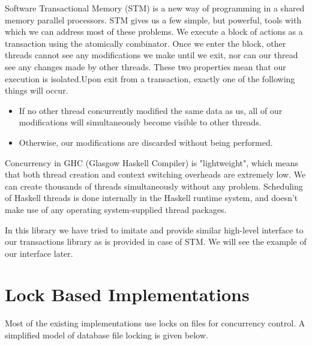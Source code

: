 \documentclass[11pt,a4paper]{article}
\begin{document}
Software Transactional Memory (STM) is a new way of programming in a shared memory parallel processors. STM gives us a few simple, but powerful, tools with which we can address most of these problems. We execute a block of actions as a transaction using the atomically combinator. Once we enter the block, other threads cannot see any modifications we make until we exit, nor can our thread see any changes made by other threads. These two properties mean that our execution is isolated.Upon exit from a transaction, exactly one of the following things will occur.
\begin{itemize}
\item If no other thread concurrently modified the same data as us, all of our modifications will simultaneously become visible to other threads.
\item Otherwise, our modifications are discarded without being performed.
\end{itemize}

Concurrency in GHC (Glasgow Haskell Compiler) is "lightweight", which means that both thread creation and context switching overheads are extremely low. We can create thousands of threads simultaneously without any problem. Scheduling of Haskell threads is done internally in the Haskell runtime system, and doesn't make use of any operating system-supplied thread packages.

In this library we have tried to imitate and provide similar high-level interface to our transactions library as is provided in case of STM. We will see the example of our interface later.



\section{Lock Based Implementations}
Most of the existing implementations use locks on files for concurrency control. A simplified model of database file locking  is given below.
\end{document}
